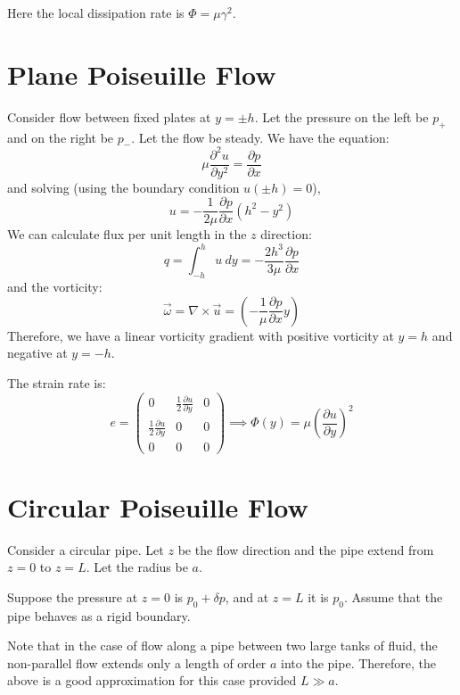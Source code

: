 \documentclass[../Main.tex]{subfiles}
\begin{document}
Here the local dissipation rate is $\Phi = \mu \gamma^2$.
\section{Plane Poiseuille Flow}
Consider flow between fixed plates at $y = \pm h$. Let the pressure on the left be $p_+$ and on the right be $p_-$. Let the flow be steady. We have the equation:
\begin{equation*}
    \mu \frac{\partial^{2}u}{\partial y^{2}} = \frac{\partial p}{\partial x}
\end{equation*}
and solving (using the boundary condition $u(\pm h) = 0$),
\begin{equation*}
    u = -\frac1{2\mu} \frac{\partial p}{\partial x} \left(h^2 - y^2\right)
\end{equation*}
We can calculate flux per unit length in the $z$ direction:
\begin{equation*}
    q = \int_{-h}^{h} u~dy = -\frac{2h^3}{3\mu} \frac{\partial p}{\partial x}
\end{equation*}
and the vorticity:
\begin{equation*}
    \vec{\omega} = \nabla \times \vec{u} = \left(-\frac1\mu \frac{\partial p}{\partial x} y\right)
\end{equation*}
Therefore, we have a linear vorticity gradient with positive vorticity at $y = h$ and negative at $y = -h$.

The strain rate is:
\begin{equation*}
    e =
    \begin{pmatrix}
        0 & \frac12 \frac{\partial u}{\partial y} & 0 \\
        \frac12 \frac{\partial u}{\partial y} & 0 & 0 \\
        0 & 0 & 0
    \end{pmatrix}
    \implies \Phi(y) = \mu \left(\frac{\partial u}{\partial y}\right)^2
\end{equation*}
\section{Circular Poiseuille Flow}
Consider a circular pipe. Let $z$ be the flow direction and the pipe extend from $z = 0$ to $z = L$. Let the radius be $a$.

Suppose the pressure at $z = 0$ is $p_0 + \delta p$, and at $z = L$ it is $p_0$. Assume that the pipe behaves as a rigid boundary. 

Note that in the case of flow along a pipe between two large tanks of fluid, the non-parallel flow extends only a length of order $a$ into the pipe. Therefore, the above is a good approximation for this case provided $L \gg a$.
\end{document}
